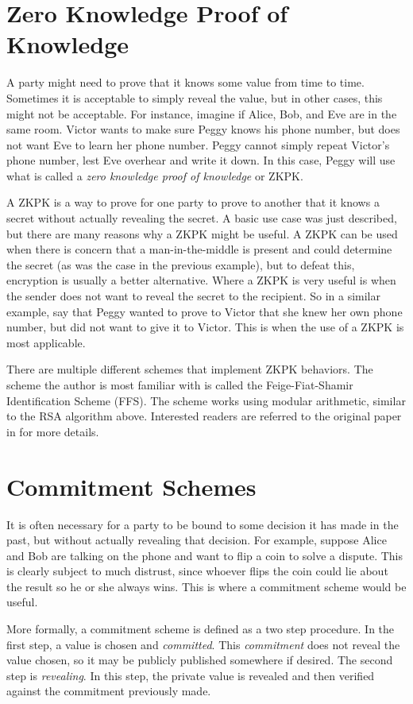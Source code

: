 \section{Zero Knowledge Proof of Knowledge}
A party might need to prove that it knows some value from time to time. Sometimes it is acceptable
to simply reveal the value, but in other cases, this might not be acceptable. For instance, imagine
if Alice, Bob, and Eve are in the same room. Victor  wants to make sure Peggy knows his phone number,
but does not want Eve to learn her phone number. Peggy cannot simply repeat Victor's phone
number, lest Eve overhear and write it down. In this case, Peggy will use what is called a
\textit{zero knowledge proof of knowledge} or ZKPK.

A ZKPK is a way to prove for one party to prove to another that it knows a secret without actually
revealing the secret. A basic use case was just described, but there are many reasons why a ZKPK
might be useful. A ZKPK can be used when there is concern that a man-in-the-middle is present
and could determine the secret (as was the case in the previous example), but to defeat this,
encryption is usually a better alternative. Where a ZKPK is very useful is when the sender does not
want to reveal the secret to the recipient. So in a similar example, say that Peggy wanted to prove to
Victor that she knew her own phone number, but did not want to give it to Victor. This is when the
use of a ZKPK is most applicable.

There are multiple different schemes that implement ZKPK behaviors. 
The scheme the author is most familiar with is called the Feige-Fiat-Shamir Identification Scheme (FFS). 
The scheme works using modular arithmetic, similar to the RSA algorithm above.
Interested readers are referred to the original paper in \cite{ffs} for more details. 

\section{Commitment Schemes}
It is often necessary for a party to be bound to some decision it has made in the past, but without
actually revealing that decision. For example, suppose Alice and Bob are talking on the phone and
want to flip a coin to solve a dispute. This is clearly subject to much distrust, since whoever flips the
coin could lie about the result so he or she always wins.
This is where a commitment scheme would be useful.

More formally, a commitment scheme is defined as a two step procedure. In the first step, a value
is chosen and \textit{committed}. This \textit{commitment} does not reveal the value chosen, so it
may be publicly published somewhere if desired. The second step is \textit{revealing}. In this step,
the private value is revealed and then verified against the commitment previously made.

